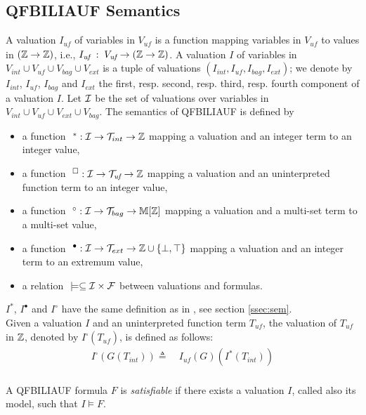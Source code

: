 \subsection{QFBILIAUF Semantics}
\label{ssec:semUF}
A valuation $I_{\textit{uf}}$ of variables in $V_{\textit{uf}}$ is a function mapping variables in $V_{\textit{uf}}$ to values in $(\mathbb{Z} \rightarrow \mathbb{Z})$, i.e.,
$I_{\textit{uf}} \; : \; V_{\textit{uf}} \rightarrow (\mathbb{Z} \rightarrow \mathbb{Z})$.
A valuation $I$ of variables in $V_{int}\cup V_{\textit{uf}} \cup V_{bag} \cup V_{ext}$ is a tuple of valuations $(I_{int}, I_{\textit{uf}}, I_{bag}, I_{ext})$;
we denote by $I_{int}$, $I_{\textit{uf}}$, $I_{bag}$ and $I_{ext}$ the first, resp. second, resp. third, resp. fourth component of a valuation $I$.
Let $\mathcal{I}$ be the set of valuations over variables in $V_{int}\cup V_{\textit{uf}} \cup V_{ext} \cup V_{bag}$.
The semantics of QFBILIAUF is defined by
\begin{itemize}
\item a function $\ ^*: \mathcal{I}\rightarrow \mathcal{T}_{int}\rightarrow \mathbb{Z}$ mapping a valuation and an integer term to an integer value,
\item a function $\ ^\square: \mathcal{I}\rightarrow \mathcal{T}_{\textit{uf}}\rightarrow \mathbb{Z} $ mapping a valuation and an uninterpreted function term to an integer value,
\item a function $\ ^\circ: \mathcal{I}\rightarrow \mathcal{T}_{bag}\rightarrow \mathbb{M}[\mathbb{Z}]$ mapping a valuation and a multi-set term to a multi-set value,
\item a function $\ ^{\bullet}: \mathcal{I}\rightarrow \mathcal{T}_{ext}\rightarrow \mathbb{Z}\cup\{\bot,\top\}$ mapping a valuation and an integer term to an extremum value,
\item a relation $\ \models \subseteq \mathcal{I}\times \mathcal{F}$ between valuations and formulas.
\end{itemize}
$I^{*}$, $I^{\bullet}$ and $I^{\circ}$ have the same definition as in \QFBILIA, see section \ref{ssec:sem}.
\\
Given a valuation $I$ and an uninterpreted function term $T_{\textit{uf}}$, the valuation of $T_{\textit{uf}}$ in $\mathbb{Z}$,
denoted by $I^{\square}(T_{\textit{uf}})$, is defined as follows:
\begin{align*}
I^{\square}(G(T_{int})) \triangleq&\ I_{\textit{uf}}(G)(I^*(T_{int})) \\
\end{align*}

\begin{mydef}
  A QFBILIAUF formula $F$ is \emph{satisfiable} if there exists a valuation $I$, called also its model, such that $I \models F$.
\end{mydef}

